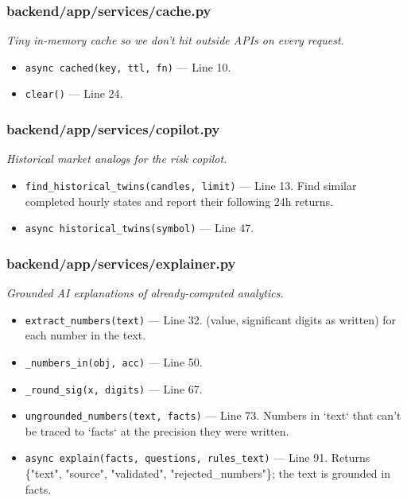 \subsubsection*{backend/app/services/cache.py}
\textit{Tiny in-memory cache so we don't hit outside APIs on every request.}
\begin{itemize}[nosep,leftmargin=1.5em]
\item \texttt{async cached(\allowbreak{}key,\allowbreak{} ttl,\allowbreak{} fn)} --- Line 10.
\item \texttt{clear(\allowbreak{})} --- Line 24.
\end{itemize}
\subsubsection*{backend/app/services/copilot.py}
\textit{Historical market analogs for the risk copilot.}
\begin{itemize}[nosep,leftmargin=1.5em]
\item \texttt{find\_\allowbreak{}historical\_\allowbreak{}twins(\allowbreak{}candles,\allowbreak{} limit)} --- Line 13. Find similar completed hourly states and report their following 24h returns.
\item \texttt{async historical\_\allowbreak{}twins(\allowbreak{}symbol)} --- Line 47.
\end{itemize}
\subsubsection*{backend/app/services/explainer.py}
\textit{Grounded AI explanations of already-computed analytics.}
\begin{itemize}[nosep,leftmargin=1.5em]
\item \texttt{extract\_\allowbreak{}numbers(\allowbreak{}text)} --- Line 32. (value, significant digits as written) for each number in the text.
\item \texttt{\_\allowbreak{}numbers\_\allowbreak{}in(\allowbreak{}obj,\allowbreak{} acc)} --- Line 50.
\item \texttt{\_\allowbreak{}round\_\allowbreak{}sig(\allowbreak{}x,\allowbreak{} digits)} --- Line 67.
\item \texttt{ungrounded\_\allowbreak{}numbers(\allowbreak{}text,\allowbreak{} facts)} --- Line 73. Numbers in `text` that can't be traced to `facts` at the precision they were written.
\item \texttt{async explain(\allowbreak{}facts,\allowbreak{} questions,\allowbreak{} rules\_\allowbreak{}text)} --- Line 91. Returns \{"text", "source", "validated", "rejected\_numbers"\}; the text is grounded in facts.
\end{itemize}
